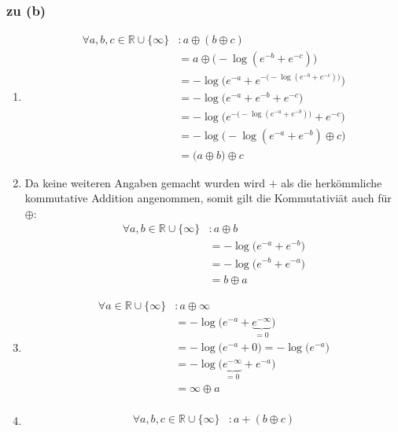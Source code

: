 \documentclass{scrartcl}
\begin{document}
\subsubsection{zu (b)}

\renewcommand{\baseset}{\mathbb{R} \cup \{\infty\}}
\begin{enumerate}
    \item \begin{align*}
        \forall a, b, c \in \baseset&: a \oplus (b \oplus c)\\
            &= a \oplus \big(-\log(e^{-b} + e^{-c})\big)\\
            &= -\log\Big(e^{-a} + e^{-\big(-\log(e^{-b} + e^{-c})\big)}\Big)\\
            &= -\log\Big(e^{-a} + e^{-b} + e^{-c}\Big)\\
            &= -\log\Big(e^{-\big(-\log(e^{-a} + e^{-b})\big)} + e^{-c}\Big)\\
            &= -\log\big(-\log(e^{-a} + e^{-b}) \oplus c\big)\\
            &= \big(a \oplus b\big) \oplus c
    \end{align*}
    \item Da keine weiteren Angaben gemacht wurden wird $+$ als die herkömmliche kommutative Addition angenommen, somit gilt die Kommutativiät auch für $\oplus$:
    \begin{align*}
        \forall a, b \in \baseset&: a \oplus b\\
            &= -\log\big(e^{-a} + e^{-b}\big)\\
            &= -\log\big(e^{-b} + e^{-a}\big)\\
            &= b \oplus a
    \end{align*}
    \item \begin{align*}
        \forall a \in \baseset&: a \oplus \infty\\
            &= -\log\big(e^{-a} + \underbrace{e^{-\infty}}_{= 0}\big)\\
            &= -\log\big(e^{-a} + 0\big) = -\log\big(e^{-a}\big)\\
            &= -\log\big(\underbrace{e^{-\infty}}_{= 0} + e^{-a}\big)\\
            &= \infty \oplus a\\
    \end{align*}
    \item \begin{align*}
        \forall a, b, c \in \baseset&: a + (b \oplus c)\\

\end{align*}
\end{enumerate}
\end{document}
